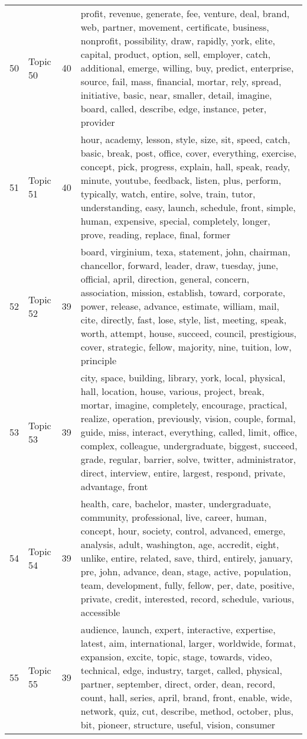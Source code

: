 \begin{table}[ht]
{\begin{tabularx}{\textwidth}{llrX}
   50 & Topic 50 & 40 & profit, revenue, generate, fee, venture, deal, brand, web, partner, movement, certificate, business, nonprofit, possibility, draw, rapidly, york, elite, capital, product, option, sell, employer, catch, additional, emerge, willing, buy, predict, enterprise, source, fail, mass, financial, mortar, rely, spread, initiative, basic, near, smaller, detail, imagine, board, called, describe, edge, instance, peter, provider \\ 
   51 & Topic 51 & 40 & hour, academy, lesson, style, size, sit, speed, catch, basic, break, post, office, cover, everything, exercise, concept, pick, progress, explain, hall, speak, ready, minute, youtube, feedback, listen, plus, perform, typically, watch, entire, solve, train, tutor, understanding, easy, launch, schedule, front, simple, human, expensive, special, completely, longer, prove, reading, replace, final, former \\ 
   52 & Topic 52 & 39 & board, virginium, texa, statement, john, chairman, chancellor, forward, leader, draw, tuesday, june, official, april, direction, general, concern, association, mission, establish, toward, corporate, power, release, advance, estimate, william, mail, cite, directly, fast, lose, style, list, meeting, speak, worth, attempt, house, succeed, council, prestigious, cover, strategic, fellow, majority, nine, tuition, low, principle \\ 
   53 & Topic 53 & 39 & city, space, building, library, york, local, physical, hall, location, house, various, project, break, mortar, imagine, completely, encourage, practical, realize, operation, previously, vision, couple, formal, guide, miss, interact, everything, called, limit, office, complex, colleague, undergraduate, biggest, succeed, grade, regular, barrier, solve, twitter, administrator, direct, interview, entire, largest, respond, private, advantage, front \\ 
   54 & Topic 54 & 39 & health, care, bachelor, master, undergraduate, community, professional, live, career, human, concept, hour, society, control, advanced, emerge, analysis, adult, washington, age, accredit, eight, unlike, entire, related, save, third, entirely, january, pre, john, advance, dean, stage, active, population, team, development, fully, fellow, per, date, positive, private, credit, interested, record, schedule, various, accessible \\ 
   55 & Topic 55 & 39 & audience, launch, expert, interactive, expertise, latest, aim, international, larger, worldwide, format, expansion, excite, topic, stage, towards, video, technical, edge, industry, target, called, physical, partner, september, direct, order, dean, record, count, hall, series, april, brand, front, enable, wide, network, quiz, cut, describe, method, october, plus, bit, pioneer, structure, useful, vision, consumer \\ 

\end{tabularx}}
\end{table}
